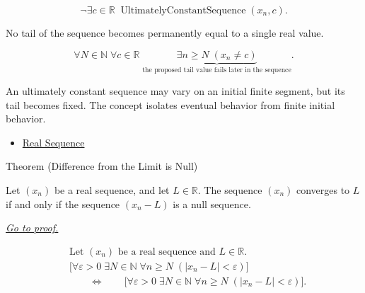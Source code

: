\begin{remark*}
\[
\neg\exists c \in \mathbb{R}\;
\operatorname{UltimatelyConstantSequence}(x_n,c).
\]
\end{remark*}

\begin{remark*}
No tail of the sequence becomes permanently equal to a single real value.
\end{remark*}

\begin{remark*}
\[
\forall N \in \mathbb{N}\;
\forall c \in \mathbb{R}\;
\underbrace{\exists n \ge N\;(x_n \neq c)}
_{\text{the proposed tail value fails later in the sequence}}.
\]
\end{remark*}

\begin{remark*}[Interpretation]
An ultimately constant sequence may vary on an initial finite segment, but its
tail becomes fixed. The concept isolates eventual behavior from finite
initial behavior.
\end{remark*}

\begin{dependencies}
\begin{itemize}
  \item \hyperref[def:real-sequence]{Real Sequence}
\end{itemize}
\end{dependencies}


\begin{theorembox}{Theorem (Difference from the Limit is Null)}
\begin{theorem}
\label{thm:difference-from-limit-is-null}
Let $(x_n)$ be a real sequence, and let $L \in \mathbb{R}$. The sequence
$(x_n)$ converges to $L$ if and only if the sequence $(x_n - L)$ is a null
sequence.

\smallskip
\noindent
\hyperref[prf:difference-from-limit-is-null]{\textit{Go to proof.}}
\end{theorem}
\end{theorembox}

\begin{remark*}
\[
\begin{aligned}
&\text{Let } (x_n) \text{ be a real sequence and } L \in \mathbb{R}.\\
&\bigl[
\forall \varepsilon > 0\;
\exists N \in \mathbb{N}\;
\forall n \ge N\;(|x_n - L| < \varepsilon)
\bigr]\\
&\qquad\Longleftrightarrow\qquad
\bigl[
\forall \varepsilon > 0\;
\exists N \in \mathbb{N}\;
\forall n \ge N\;(|x_n - L| < \varepsilon)
\bigr].
\end{aligned}
\]
\end{remark*}

